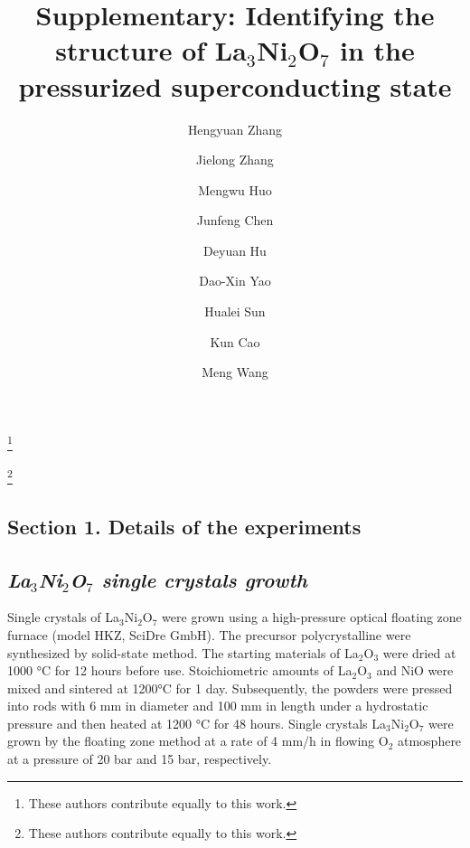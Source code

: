 \documentclass[prx,aps,twocolumn,preprintnumbers,amsmath,amssymb,superscriptaddress,showpacs]{revtex4-2}
\begin{document}

\title {Supplementary: Identifying the structure of La$_3$Ni$_2$O$_7$ in the pressurized superconducting state}
\author{Hengyuan Zhang}
\thanks{These authors contribute equally to this work.} 
\author{Jielong Zhang}
\thanks{These authors contribute equally to this work.} 
\author{Mengwu Huo}
\author{Junfeng Chen}
\author{Deyuan Hu}
\author{Dao-Xin Yao}
\author{Hualei Sun}
\author{Kun Cao}
\author{Meng Wang}


\maketitle

\subsection*{Section 1. Details of the experiments}

\begingroup
\renewcommand{\centering}{\raggedright}
{\subsection{\textbf{\textit{ La$_3$Ni$_2$O$_7$ single crystals growth}} }}
\endgroup

Single crystals of La$_3$Ni$_2$O$_7$  were grown using a high-pressure optical floating zone furnace (model HKZ, SciDre GmbH). The precursor polycrystalline were synthesized by solid-state method. The starting materials of  La$_2$O$_3$ were dried at 1000 °C for 12 hours before use. Stoichiometric amounts of La$_2$O$_3$ and NiO were mixed and sintered at 1200°C for 1 day. Subsequently, the powders were pressed into rods with 6 mm in diameter and 100 mm in length under a hydrostatic pressure and then heated at 1200 °C for 48 hours. Single crystals  La$_3$Ni$_2$O$_7$ were grown by the floating zone method at a rate of 4 mm/h in flowing O$_2$ atmosphere at a pressure of 20 bar and 15 bar, respectively.
\end{document}
